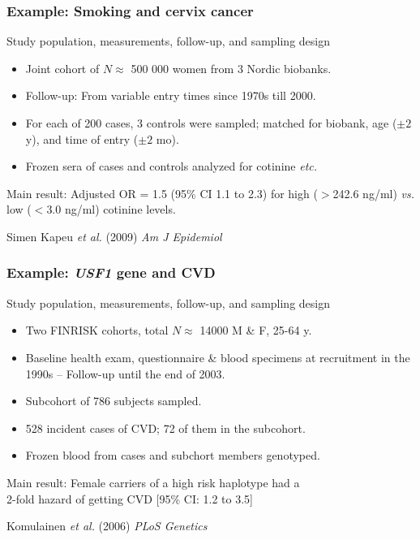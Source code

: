 \documentclass[12pt,dvipsnames,t,handout%
,aspectratio=169%
]{beamer}
\begin{document}
\begin{frame}
\frametitle{Example: Smoking and cervix cancer}%
\small
\pause
Study population,  measurements, follow-up, and sampling design
\begin{itemize}
\item 
Joint cohort of $N \approx$ 500 000 women from 3
Nordic biobanks. 
%
\pause %
\item Follow-up: From variable entry times since 1970s till 2000.\pause
\item For each of 200 cases, 3 controls were sampled; matched for biobank,  %
  age ($\pm 2$ y), and time of entry ($\pm 2$ mo).\pause %
\item Frozen sera of cases and controls 
analyzed for cotinine {\it etc.}
\end{itemize}
\pause
Main result: Adjusted OR = 1.5 (95\% CI 1.1 to 2.3) for high 
($>$242.6 ng/ml) 
 {\it vs.} low ($<$3.0 ng/ml) cotinine levels.

\bigskip
Simen Kapeu {\it et al.} (2009) {\it Am J Epidemiol}
\normalsize

\end{frame}

\begin{frame}
\frametitle{Example: \emph{USF1} gene and CVD}
 
 \small
Study population,  measurements, follow-up, and sampling design
\begin{itemize}
\item
Two FINRISK cohorts, total $N \approx$ 14000 M \& F, 25-64 y.
\item Baseline health exam, questionnaire \& blood specimens
  at recruitment in the 1990s -- Follow-up until the end of 2003.
\item Subcohort of 786 subjects sampled.
\pause
\item 
528 incident cases of CVD; 72 of them in the subcohort. \pause
\item Frozen blood from cases and subchort members 
genotyped. %
\end{itemize}
\pause
Main result: Female carriers of a high risk haplotype had a \\ 2-fold hazard
 of getting CVD [95\% CI: 1.2 to 3.5] %

\bigskip
Komulainen {\it et al.} (2006) \emph{PLoS Genetics}

\normalsize

\end{frame}
\end{document}
